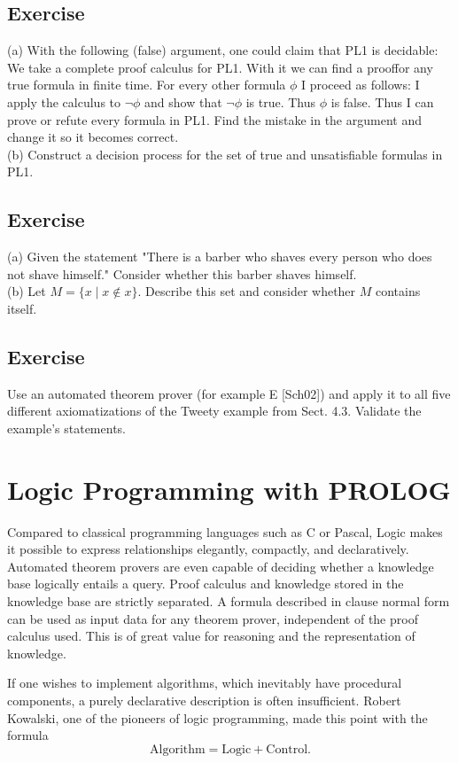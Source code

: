 \documentclass[10pt]{book}
\begin{document}
\section{Exercise}
(a) With the following (false) argument, one could claim that PL1 is decidable: We take a complete proof calculus for PL1. With it we can find a prooffor any true formula in finite time. For every other formula $\phi$ I proceed as follows: I apply the calculus to $\neg \phi$ and show that $\neg \phi$ is true. Thus $\phi$ is false. Thus I can prove or refute every formula in PL1. Find the mistake in the argument and change it so it becomes correct.\\
(b) Construct a decision process for the set of true and unsatisfiable formulas in PL1.

\section{Exercise}
(a) Given the statement "There is a barber who shaves every person who does not shave himself." Consider whether this barber shaves himself.\\
(b) Let $M=\{x \mid x \notin x\}$. Describe this set and consider whether $M$ contains itself.

\section{Exercise}
Use an automated theorem prover (for example E [Sch02]) and apply it to all five different axiomatizations of the Tweety example from Sect. 4.3. Validate the example's statements.
\chapter{Logic Programming with PROLOG}
Compared to classical programming languages such as C or Pascal, Logic makes it possible to express relationships elegantly, compactly, and declaratively. Automated theorem provers are even capable of deciding whether a knowledge base logically entails a query. Proof calculus and knowledge stored in the knowledge base are strictly separated. A formula described in clause normal form can be used as input data for any theorem prover, independent of the proof calculus used. This is of great value for reasoning and the representation of knowledge.

If one wishes to implement algorithms, which inevitably have procedural components, a purely declarative description is often insufficient. Robert Kowalski, one of the pioneers of logic programming, made this point with the formula
$$
\text{Algorithm}=\text{Logic}+\text{Control}.
$$
\end{document}
